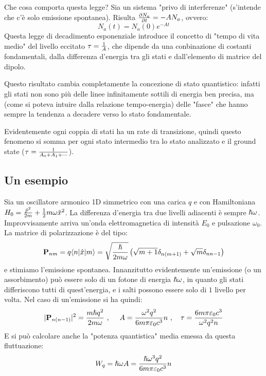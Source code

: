 Che cosa comporta questa legge? Sia un sistema "privo di interferenze" (s'intende che c'è solo emissione spontanea). Risulta $\frac{\partial N_a}{\partial t} = -A N_a$, ovvero:
\[
    N_a(t) = N_a(0)e^{-At}
\]
Questa legge di decadimento esponenziale introduce il concetto di "tempo di vita medio" del livello eccitato $\tau = \frac{1}{A}$, che dipende da una conbinazione di costanti fondamentali, dalla differenza d'energia tra gli stati e dall'elemento di matrice del dipolo.

Questo risultato cambia completamente la concezione di stato quantistico: infatti gli stati non sono più delle linee infinitamente sottili di energia ben precisa, ma (come si poteva intuire dalla relazione tempo-energia) delle "fasce" che hanno sempre la tendenza a decadere verso lo stato fondamentale.

Evidentemente ogni coppia di stati ha un rate di transizione, quindi questo fenomeno si somma per ogni stato intermedio tra lo stato analizzato e il ground state ($\tau = \frac{1}{A_0 + A_1 + \cdots}$).

\subsection{Un esempio}
Sia un oscillatore armonico 1D simmetrico con una carica $q$ e con Hamiltoniana $H_0 = \frac{\hat p^2}{2m} + \frac{1}{2} m \omega \hat x^2$. La differenza d'energia tra due livelli adiacenti è sempre $\hslash\omega$. \\
Improvvisamente arriva un'onda elettromagnetica di intensità $E_0$ e pulsazione $\omega_0$. La matrice di polarizzazione è del tipo:
\[
    \mathbf{P}_{nm} = q\langle n | \hat x | m \rangle = \sqrt{\frac{\hslash}{2m\omega}}\left( \sqrt{m+1}\delta_{n(m+1)} + \sqrt{m}\delta_{n{n-1}} \right)
\]
e stimiamo l'emissione spontanea. Innanzitutto evidentemente un'emissione (o un assorbimento) può essere solo di un fotone di energia $\hslash\omega$, in quanto gli stati differiscono tutti di quest'energia, e i salti possono essere solo di $1$ livello per volta. Nel caso di un'emissione si ha quindi:
\[
    |\mathbf{P}_{n(n-1)}|^2 = \frac{m\hslash q^2}{2m\omega}\ , \ \ \ \ A = \frac{\omega^2q^2}{6m\pi \varepsilon_0 c^3}n\ , \ \ \ \tau = \frac{6m\pi \varepsilon_0 c^3}{\omega^2q^2n}
\]
E si può calcolare anche la "potenza quantistica" media emessa da questa fluttuazione:
\[
    W_q = \hslash \omega A = \frac{\hslash\omega^3q^2}{6m\pi \varepsilon_0 c^3}n
\]

